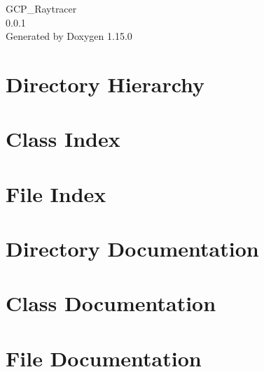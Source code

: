 \documentclass[twoside]{book}
\newcommand{\+}{\discretionary{\mbox{\scriptsize$\hookleftarrow$}}{}{}}
\newcommand{\clearemptydoublepage}{%
    \newpage{\pagestyle{empty}\cleardoublepage}%
  }
\begin{document}
  \raggedbottom
    \hypersetup{pageanchor=false,
                bookmarksnumbered=true,
                pdfencoding=unicode
               }
  \begin{titlepage}
  \vspace*{7cm}
  \begin{center}%
  {\Large GCP\+\_\+\+Raytracer}\\
  [1ex]\large 0.\+0.\+1 \\
  \vspace*{1cm}
  {\large Generated by Doxygen 1.15.0}\\
  \end{center}
  \end{titlepage}
  \clearemptydoublepage
  \tableofcontents
  \clearemptydoublepage
  \hypersetup{pageanchor=true}
\chapter{Directory Hierarchy}

\chapter{Class Index}

\chapter{File Index}

\chapter{Directory Documentation}

\chapter{Class Documentation}












\chapter{File Documentation}


















  \backmatter
  \newpage
  \clearemptydoublepage
  \printindex
\end{document}
